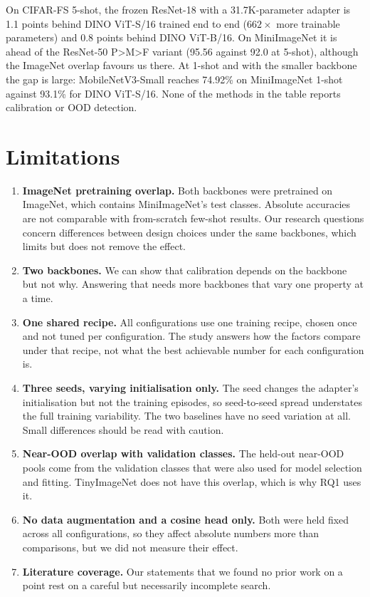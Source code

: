 On CIFAR-FS 5-shot, the frozen ResNet-18 with a 31.7K-parameter adapter is 1.1 points behind DINO
ViT-S/16 trained end to end ($662\times$ more trainable parameters) and 0.8 points behind DINO ViT-B/16.
On MiniImageNet it is ahead of the ResNet-50 P>M>F variant (95.56 against 92.0 at 5-shot), although the
ImageNet overlap favours us there. At 1-shot and with the smaller backbone the gap is large: MobileNetV3-Small
reaches 74.92\% on MiniImageNet 1-shot against 93.1\% for DINO ViT-S/16. None of the methods in the table
reports calibration or OOD detection.

\section{Limitations}
\label{sec:limits}

\begin{enumerate}
\item \textbf{ImageNet pretraining overlap.} Both backbones were pretrained on ImageNet, which contains
MiniImageNet's test classes. Absolute accuracies are not comparable with from-scratch few-shot results.
Our research questions concern differences between design choices under the same backbones, which limits
but does not remove the effect.
\item \textbf{Two backbones.} We can show that calibration depends on the backbone but not why. Answering
that needs more backbones that vary one property at a time.
\item \textbf{One shared recipe.} All configurations use one training recipe, chosen once and not tuned per
configuration. The study answers how the factors compare under that recipe, not what the best achievable
number for each configuration is.
\item \textbf{Three seeds, varying initialisation only.} The seed changes the adapter's initialisation but
not the training episodes, so seed-to-seed spread understates the full training variability. The two
baselines have no seed variation at all. Small differences should be read with caution.
\item \textbf{Near-OOD overlap with validation classes.} The held-out near-OOD pools come from the
validation classes that were also used for model selection and fitting. TinyImageNet does not have this
overlap, which is why RQ1 uses it.
\item \textbf{No data augmentation and a cosine head only.} Both were held fixed across all
configurations, so they affect absolute numbers more than comparisons, but we did not measure their
effect.
\item \textbf{Literature coverage.} Our statements that we found no prior work on a point rest on a
careful but necessarily incomplete search.
\end{enumerate}
